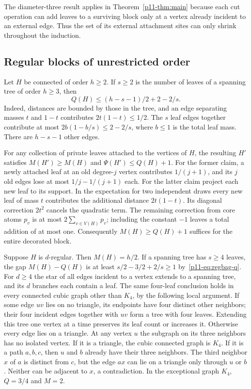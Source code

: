 \documentclass[11pt,a4paper]{article}
\begin{document}
The diameter-three result applies in Theorem~\ref{p11-thm:main} because each cut operation can add leaves to a surviving block only at a vertex already incident to an external edge. Thus the set of its external attachment sites can only shrink throughout the induction.

\subsection{Regular blocks of unrestricted order}
Let $H$ be connected of order $h\ge2$.
If $s\ge2$ is the number of leaves of a spanning tree of order $h\ge3$,
then
\begin{equation}\label{p11-eq:regbag-q}
 Q(H)\le (h-s-1)/2+2-2/s .
\end{equation}
Indeed, distances are bounded by those in the tree, and an edge separating
masses $t$ and $1-t$ contributes $2t(1-t)\le1/2$. The $s$ leaf edges
together contribute at most $2b(1-b/s)\le2-2/s$, where $b\le1$ is the
total leaf mass. There are $h-s-1$ other edges.

For any collection of private leaves attached to the vertices of $H$, the
resulting $H'$ satisfies $M(H')\ge M(H)$ and $\Psi(H')\le Q(H)+1$.
For the former claim, a newly attached leaf at an old degree-$j$ vertex
contributes $1/(j+1)$, and its $j$ old edges lose at most
$1/j-1/(j+1)$ each. For the latter claim project each new leaf to its
support. In the expectation for two independent draws every new leaf
of mass $t$ contributes the additional distance $2t(1-t)$. Its diagonal
correction $2t^2$ cancels the quadratic term. The remaining correction
from core atoms $p_v$ is at most $2\sum_{v\in V(H)}p_v$; including the
constant $-1$ leaves a total addition of at most one. Consequently
$M(H)\ge Q(H)+1$ suffices for the entire decorated block.

Suppose $H$ is $d$-regular. Then $M(H)=h/2$. If a spanning tree has
$s\ge4$ leaves, the gap $M(H)-Q(H)$ is at least
$s/2-3/2+2/s\ge1$ by~\eqref{p11-eq:regbag-q}. For $d\ge4$ the star of all
edges incident to a vertex extends to a spanning tree, and its $d$
branches each contain a leaf. The same four-leaf conclusion holds in
every connected cubic graph other than $K_4$, by the following local
argument. If some edge $uv$ lies on no triangle, its endpoints have
four distinct other neighbors; their four incident edges together with
$uv$ form a tree with four leaves. Extending this tree one vertex at a
time preserves its leaf count or increases it. Otherwise every edge lies
on a triangle. At any vertex $u$ the subgraph on its three neighbors
has no isolated vertex. If it is a triangle, the cubic connected graph
is $K_4$. If it is a path $a,b,c$, then $u$ and $b$ already have their
three neighbors. The third neighbor $x$ of $a$ is distinct from $c$,
but the edge $ax$ can lie on a triangle only through $u$ or $b$.
Neither can be adjacent to $x$, a contradiction. In the exceptional
graph $K_4$, $Q=3/4$ and $M=2$.
\end{document}
